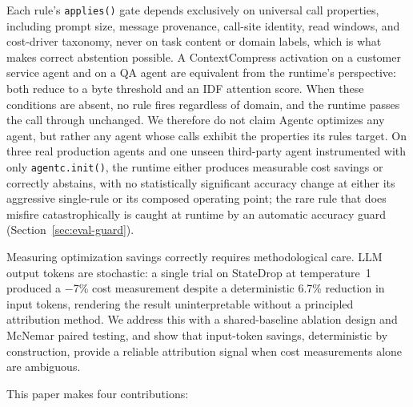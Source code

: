 \documentclass[sigconf,9pt]{acmart}
\begin{document}
Each rule's \texttt{applies()} gate depends exclusively on universal call properties,
including prompt size, message provenance, call-site identity, read windows, and
cost-driver taxonomy, never on task content or domain labels, which is what makes
correct abstention possible. A ContextCompress activation on a customer service agent
and on a QA agent are equivalent from the runtime's perspective: both reduce to a byte
threshold and an IDF attention score. When these conditions are absent, no rule fires
regardless of domain, and the runtime passes the call through unchanged. We therefore
do not claim Agentc optimizes any agent, but rather any agent whose calls exhibit the
properties its rules target. On three real production agents and one unseen third-party
agent instrumented with only \texttt{agentc.init()}, the runtime either produces
measurable cost savings or correctly abstains, with no statistically significant
accuracy change at either its aggressive single-rule or its composed operating point;
the rare rule that does misfire catastrophically is caught at runtime by an automatic
accuracy guard (Section~\ref{sec:eval-guard}).

Measuring optimization savings correctly requires methodological care. LLM output
tokens are stochastic: a single trial on StateDrop at temperature~1 produced a $-$7\%
cost measurement despite a deterministic 6.7\% reduction in input tokens, rendering
the result uninterpretable without a principled attribution method. We address this
with a shared-baseline ablation design and McNemar paired testing, and show that
input-token savings, deterministic by construction, provide a reliable attribution
signal when cost measurements alone are ambiguous.

This paper makes four contributions:
\end{document}
